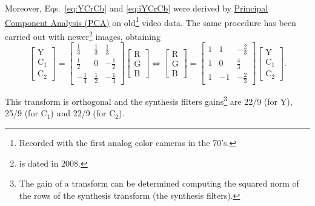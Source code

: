 Moreover, Eqs.~\ref{eq:YCrCb} and \ref{eq:iYCrCb} were derived by
\href{https://en.wikipedia.org/wiki/Principal_component_analysis}{Principal
  Component Analysis (PCA)} on old\footnote{Recorded with the first
analog color cameras in the 70's.} video data. The same procedure has
been carried out with newer\footnote{\cite{malvar2008lifting} is dated
in 2008.} images, obtaining
\begin{equation}
  \begin{bmatrix}
    \text{Y} \\
    \text{C}_1 \\
    \text{C}_2
  \end{bmatrix}
  =
  \begin{bmatrix}
    \frac{1}{3} & \frac{1}{3} &  \frac{1}{3} \\ 
    \frac{1}{2} &           0 & -\frac{1}{2} \\
   -\frac{1}{4} & \frac{1}{2} & -\frac{1}{4}
  \end{bmatrix}
  \begin{bmatrix}
    \text{R} \\
    \text{G} \\
    \text{B}
  \end{bmatrix}
  \Leftrightarrow
  \begin{bmatrix}
    \text{R} \\
    \text{G} \\
    \text{B}
  \end{bmatrix}
  =
  \begin{bmatrix}
    1  &  1  & -\frac{2}{3} \\ 
    1  &  0  &  \frac{4}{3} \\ 
    1  & -1  & -\frac{2}{3}
  \end{bmatrix}
  \begin{bmatrix}
    \text{Y} \\
    \text{C}_1 \\
    \text{C}_2
  \end{bmatrix}.
  \label{eq:optimal}
\end{equation}

This transform is orthogonal and the synthesis filters
gains\footnote{The gain of a transform can be determined computing the
squared norm of the rows of the synthesis transform (the synthesis
filters).} are 22/9 (for $\text{Y}$), 25/9 (for $\text{C}_1$) and 22/9
(for $\text{C}_2$).

